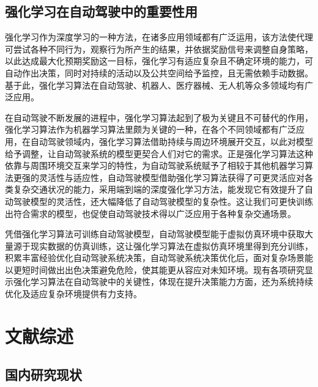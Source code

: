 \subsection{强化学习在自动驾驶中的重要性用}

强化学习作为深度学习的一种方法，在诸多应用领域都有广泛运用，该方法使代理可尝试各种不同行为，观察行为所产生的结果，并依据奖励信号来调整自身策略，以此达成最大化预期奖励这一目标，强化学习有适应复杂且不确定环境的能力，可自动作出决策，同时对持续的活动以及公共空间给予监控，且无需依赖手动数据。基于此，强化学习算法在自动驾驶、机器人、医疗器械、无人机等众多领域均有广泛应用。

在自动驾驶不断发展的进程中，强化学习算法起到了极为关键且不可替代的作用，强化学习算法作为机器学习算法里颇为关键的一种，在各个不同领域都有广泛应用，在自动驾驶领域内，强化学习算法借助持续与周边环境展开交互，以此对模型给予调整，让自动驾驶系统的模型更契合人们对它的需求。正是强化学习算法这种依靠与周围环境交互来学习的特性，为自动驾驶系统赋予了相较于其他机器学习算法更强的灵活性与适应性，自动驾驶模型借助强化学习算法获得了可更灵活应对各类复杂交通状况的能力\cite{韩胜明2023深度强化学习在自动驾驶系统中的应用综述}，采用端到端的深度强化学习方法，能发现它有效提升了自动驾驶模型的灵活性，还大幅降低了自动驾驶模型的复杂性。这让我们可更快训练出符合需求的模型，也促使自动驾驶技术得以广泛应用于各种复杂交通场景\cite{魏兆吉2021端到端免模型深度强化学习在自动驾驶中的应用研究}。

凭借强化学习算法可训练自动驾驶模型，自动驾驶模型能于虚拟仿真环境中获取大量源于现实数据的仿真训练，这让强化学习算法在虚拟仿真环境里得到充分训练\cite{梁恩云2022面向自动驾驶仿真测试的数字孪生场景交互研究与实现}，积累丰富经验优化自动驾驶系统决策，自动驾驶系统决策优化后，面对复杂场景能以更短时间做出出色决策避免危险，使其能更从容应对未知环境。现有各项研究显示强化学习算法在自动驾驶中的关键性，体现在提升决策能力方面，还为系统持续优化及适应复杂环境提供有力支持。


\section{文献综述}

\subsection{国内研究现状}

